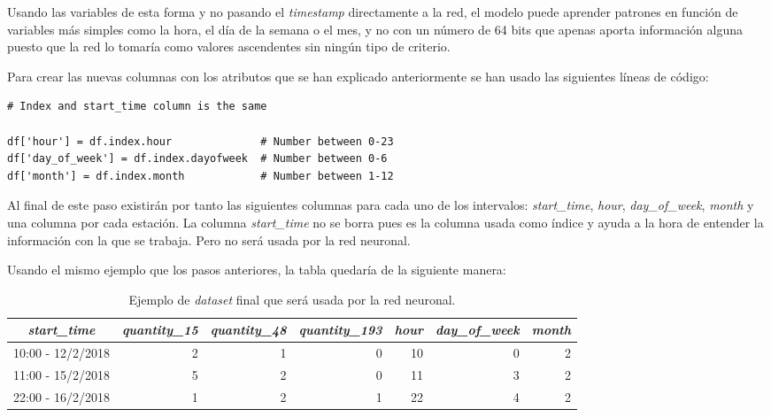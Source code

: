 \begin{enumerate}
    Usando las variables de esta forma y no pasando el \textit{timestamp} directamente a la red, el modelo puede aprender patrones en función de variables más simples como la hora, el día de la semana o el mes, y no con un número de 64 bits que apenas aporta información alguna puesto que la red lo tomaría como valores ascendentes sin ningún tipo de criterio.
    
    Para crear las nuevas columnas con los atributos que se han explicado anteriormente se han usado las siguientes líneas de código:
    \begin{verbatim}
# Index and start_time column is the same

df['hour'] = df.index.hour              # Number between 0-23
df['day_of_week'] = df.index.dayofweek  # Number between 0-6
df['month'] = df.index.month            # Number between 1-12
    \end{verbatim}
    
    Al final de este paso existirán por tanto las siguientes columnas para cada uno de los intervalos: \textit{start\_time}, \textit{hour}, \textit{day\_of\_week}, \textit{month} y una columna por cada estación. La columna \textit{start\_time} no se borra pues es la columna usada como índice y ayuda a la hora de entender la información con la que se trabaja. Pero no será usada por la red neuronal.
    \newline
    
    Usando el mismo ejemplo que los pasos anteriores, la tabla quedaría de la siguiente manera:
    \begin{table}[H]
    \footnotesize
    \centering
    \begin{tabular}{c|rrr|rrr}
        \toprule
        \textit{start\_time} & \textit{quantity\_15} & \textit{quantity\_48} & \textit{quantity\_193} & \textit{hour} & \textit{day\_of\_week} & \textit{month} \\
        \midrule
        10:00 - 12/2/2018 & 2 & 1 & 0 & 10 & 0 & 2 \\
        11:00 - 15/2/2018 & 5 & 2 & 0 & 11 & 3 & 2 \\
        22:00 - 16/2/2018 & 1 & 2 & 1 & 22 & 4 & 2 \\
        
        \bottomrule
    \end{tabular}
    \cprotect\caption{Ejemplo de \textit{dataset} final que será usada por la red neuronal.}
    \label{tab:intervals_example}
    \end{table}
    

\end{enumerate}
